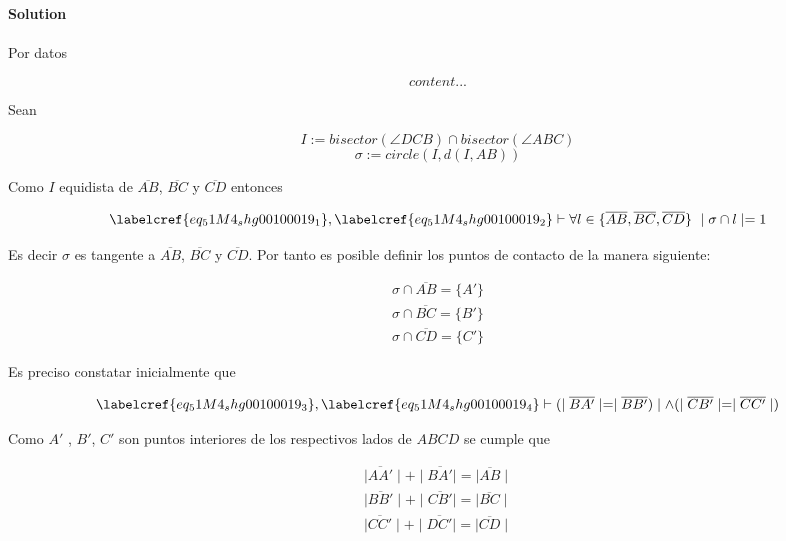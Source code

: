 
\noindent\textbf{Solution}\\\\

Por datos 

\begin{equation}
	content...
\end{equation}

Sean

\begin{equation} \label{eq_51M4_shg00100019_1}
	I := bisector(\angle DCB) \cap bisector(\angle ABC)
\end{equation}
\begin{equation} \label{eq_51M4_shg00100019_2}
	\sigma := circle(I, d(I, AB))
\end{equation}

Como $I$ equidista de $\overline{AB}$, $\overline{BC}$ y $\overline{CD}$ entonces 

\begin{equation} \label{eq_51M4_shg00100019_3}
	\labelcref{eq_51M4_shg00100019_1}, \labelcref{eq_51M4_shg00100019_2} \vdash \forall l \in \{\overline{AB}, \overline{BC}, \overline{CD} \}\ \mid \sigma \cap l \mid = 1
\end{equation}

Es decir $\sigma$ es tangente a $\overline{AB}$, $\overline{BC}$ y $\overline{CD}$. Por tanto es posible definir los puntos de contacto de la manera siguiente:

\begin{equation} \label{eq_51M4_shg00100019_4}
\begin{gathered}
	\sigma \cap \overline{AB} = \{A'\} \\
	\sigma \cap \overline{BC} = \{B'\} \\
	\sigma \cap \overline{CD} = \{C'\}
\end{gathered}
\end{equation}

Es preciso constatar inicialmente que 

\begin{equation} \label{eq_51M4_shg00100019_5}
	\labelcref{eq_51M4_shg00100019_3}, \labelcref{eq_51M4_shg00100019_4} \vdash (\mid\overline{BA'}\mid = \mid\overline{BB'})\mid \land (\mid\overline{CB'}\mid = \mid\overline{CC'}\mid)
\end{equation}

Como $A'$ , $B'$, $C'$ son puntos interiores de los respectivos lados de $ABCD$ se cumple que

\begin{equation} \label{eq_51M4_shg00100019_6}
\begin{gathered}
	\mid\overline{AA'}\mid + \mid\overline{BA'}\mid = \mid\overline{AB}\mid \\
	\mid\overline{BB'}\mid + \mid\overline{CB'}\mid = \mid\overline{BC}\mid \\
	\mid\overline{CC'}\mid + \mid\overline{DC'}\mid = \mid\overline{CD}\mid
\end{gathered}
\end{equation}

